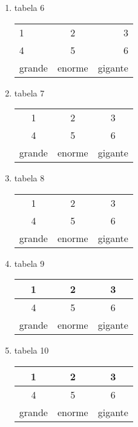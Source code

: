 \documentclass[10pt,a4paper]{report}
\begin{document}
\begin{enumerate}
\item tabela 6\\
\begin{center}
\begin{tabular}{|l|c|r|}
\hline
1 & 2 & 3 \\ 
4 & 5 & 6 \\ 
grande & enorme & gigante \\ 
\end{tabular}
\end{center}

\item tabela 7\\
\begin{center}
\begin{tabular}{|c|c|c|}
\hline
1 & 2 & 3 \\ 
4 & 5 & 6 \\ 
\hline
grande & enorme & gigante \\ 
\end{tabular}
\end{center}



\item tabela 8\\
\begin{center}
\begin{tabular}{|c|c|c|}
\hline
1 & 2 & 3 \\ 
4 & 5 & 6 \\ 
\hline
grande & enorme & gigante \\ 
\end{tabular}
\end{center}

\item tabela 9\\
\begin{center}
\begin{tabular}{|c|c|c|}
\hline
1 & 2 & 3 \\ 
\hline
4 & 5 & 6 \\ 
\hline
grande & enorme & gigante \\ 
\end{tabular}
\end{center}

\item tabela 10\\
\begin{center}
\begin{tabular}{|c|c|c|}
\hline
1 & 2 & 3 \\ 
\hline
4 & 5 & 6 \\ 
\hline
grande & enorme & gigante \\ 
\hline
\end{tabular}
\end{center}


\end{enumerate}
\end{document}
